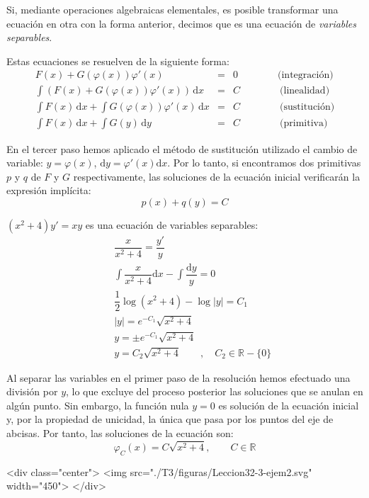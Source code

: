 Si, mediante operaciones algebraicas elementales, es posible transformar una ecuación en otra con la forma anterior, decimos que es una ecuación de \emph{variables separables}. 

Estas ecuaciones se resuelven de la siguiente forma:
\begin{eqnarray*}
F(x)+G(\varphi(x))\varphi'(x) &=& 0 \qquad\qquad\mbox{(integración)}\\
\int (F(x) + G(\varphi(x))\varphi'(x))\,\mathrm dx &=& C \qquad\qquad\mbox{(linealidad)}\\
\int F(x)\,\mathrm dx + \int G(\varphi(x))\varphi'(x)\,\mathrm dx 	&=& C \qquad\qquad\mbox{(sustitución)}\\
\int F(x)\,\mathrm dx + \int G(y)\,\mathrm dy &=& C \qquad\qquad\mbox{(primitiva)}
\end{eqnarray*}

En el tercer paso hemos aplicado el método de sustitución utilizado el cambio de variable: $y=\varphi(x)$, $\mathrm dy=\varphi'(x)\mathrm dx$. Por lo tanto, si encontramos dos primitivas $p$ y $q$ de $F$ y $G$ respectivamente, las soluciones de la ecuación inicial verificarán la expresión implícita:
\[
p(x)+q(y)=C
\]
%
\begin{ejemplo}
$(x^2+4)y' = xy$ es una ecuación de variables separables:
\begin{eqnarray*}
&&\dfrac{x}{x^2+4}=\dfrac{y'}{y}\\
&&\int\dfrac{x}{x^2+4}\mathrm dx-\int\dfrac{\mathrm dy}{y}=0\\
&&\dfrac12\log (x^2+4)-\log |y|= C_1\\
&&|y|=e^{-C_1}\sqrt{x^2+4}\\
&&y=\pm e^{-C_1}\sqrt{x^2+4}\\
&&y=C_2\sqrt{x^2+4} \qquad,\quad C_2\in\mathbb{R}-\{0\}
\end{eqnarray*}

Al separar las variables en el primer paso de la resolución hemos efectuado una división por
$y$, lo que excluye del proceso posterior las soluciones que se anulan en algún punto. Sin embargo, la función nula $y=0$ es solución de la ecuación inicial y, por la propiedad de unicidad, la única que pasa por los puntos del eje de abcisas. Por tanto, las soluciones de la ecuación son:
\begin{equation}
\varphi_C(x)=C\sqrt{x^2+4}, \qquad C\in\mathbb{R}\tag*{\fej}
\end{equation}
\begin{rawhtml}
<div class="center">
<img src="./T3/figuras/Leccion32-3-ejem2.svg" width="450">
</div>
\end{rawhtml}
\end{ejemplo}

